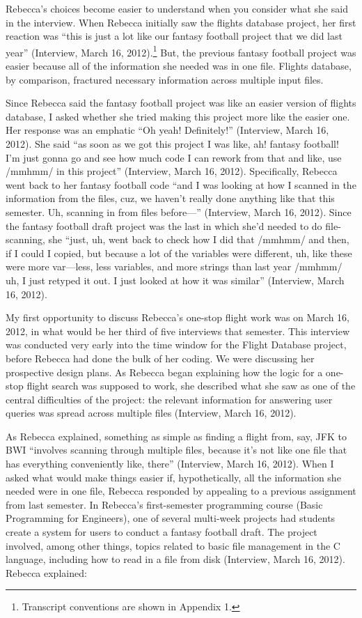 Rebecca's choices become easier to understand when you consider what she
said in the interview. When Rebecca initially saw the flights database
project, her first reaction was ``this is just a lot like our fantasy
football project that we did last year'' (Interview, March 16,
2012).\footnote{Transcript conventions are shown in Appendix 1.} But,
the previous fantasy football project was easier because all of the
information she needed was in one file. Flights database, by comparison,
fractured necessary information across multiple input files.

Since Rebecca said the fantasy football project was like an easier
version of flights database, I asked whether she tried making this
project more like the easier one. Her response was an emphatic ``Oh
yeah! Definitely!'' (Interview, March 16, 2012). She said ``as soon as
we got this project I was like, ah! fantasy football! I'm just gonna go
and see how much code I can rework from that and like, use /mmhmm/ in
this project'' (Interview, March 16, 2012). Specifically, Rebecca went
back to her fantasy football code ``and I was looking at how I scanned
in the information from the files, cuz, we haven't really done anything
like that this semester. Uh, scanning in from files before---''
(Interview, March 16, 2012). Since the fantasy football draft project
was the last in which she'd needed to do file-scanning, she ``just, uh,
went back to check how I did that /mmhmm/ and then, if I could I copied,
but because a lot of the variables were different, uh, like these were
more var---less, less variables, and more strings than last year /mmhmm/
uh, I just retyped it out. I just looked at how it was similar''
(Interview, March 16, 2012).

My first opportunity to discuss Rebecca's one-stop flight work was on
March 16, 2012, in what would be her third of five interviews that
semester. This interview was conducted very early into the time window
for the Flight Database project, before Rebecca had done the bulk of her
coding. We were discussing her prospective design plans. As Rebecca
began explaining how the logic for a one-stop flight search was supposed
to work, she described what she saw as one of the central difficulties
of the project: the relevant information for answering user queries was
spread across multiple files (Interview, March 16, 2012).

As Rebecca explained, something as simple as finding a flight from, say,
JFK to BWI ``involves scanning through multiple files, because it's not
like one file that has everything conveniently like, there'' (Interview,
March 16, 2012). When I asked what would make things easier if,
hypothetically, all the information she needed were in one file, Rebecca
responded by appealing to a previous assignment from last semester. In
Rebecca's first-semester programming course (Basic Programming for
Engineers), one of several multi-week projects had students create a
system for users to conduct a fantasy football draft. The project
involved, among other things, topics related to basic file management in
the C language, including how to read in a file from disk (Interview,
March 16, 2012). Rebecca explained:

